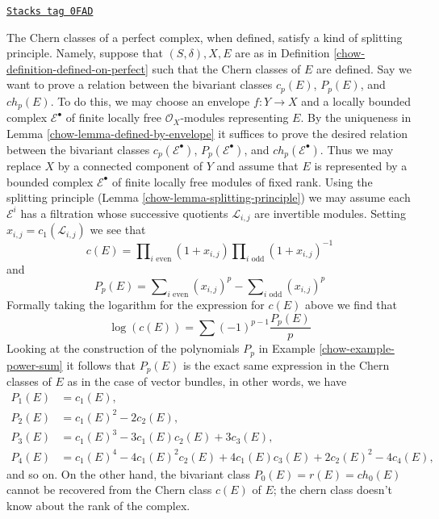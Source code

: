 \begin{remark}
\label{chow-remark-splitting-principle-perfect}
\href{https://stacks.math.columbia.edu/tag/0FAD}{\texttt{Stacks tag 0FAD}}

The Chern classes of a perfect complex, when defined, satisfy a kind of
splitting principle. Namely, suppose that $(S, \delta), X, E$ are as in
Definition \ref{chow-definition-defined-on-perfect}
such that the Chern classes of $E$ are defined.
Say we want to prove a relation between the bivariant classes
$c_p(E)$, $P_p(E)$, and $ch_p(E)$. To do this, we may choose an
envelope $f : Y \to X$ and a locally bounded
complex $\mathcal{E}^\bullet$ of finite locally free $\mathcal{O}_X$-modules
representing $E$. By the uniqueness in Lemma \ref{chow-lemma-defined-by-envelope}
it suffices to prove the desired relation between the bivariant classes
$c_p(\mathcal{E}^\bullet)$, $P_p(\mathcal{E}^\bullet)$, and
$ch_p(\mathcal{E}^\bullet)$. Thus we may replace $X$ by a connected
component of $Y$ and assume that $E$ is represented by a bounded
complex $\mathcal{E}^\bullet$ of finite locally free modules of fixed rank.
Using the splitting principle
(Lemma \ref{chow-lemma-splitting-principle}) we may assume each
$\mathcal{E}^i$ has a filtration whose successive
quotients $\mathcal{L}_{i, j}$ are invertible modules.
Setting $x_{i, j} = c_1(\mathcal{L}_{i, j})$ we see that
$$
c(E) =
\prod\nolimits_{i\text{ even}} (1 + x_{i, j})
\prod\nolimits_{i\text{ odd}} (1 + x_{i, j})^{-1}
$$
and
$$
P_p(E) =  \sum\nolimits_{i\text{ even}} (x_{i, j})^p -
\sum\nolimits_{i\text{ odd}} (x_{i, j})^p
$$
Formally taking the logarithm for the expression for $c(E)$ above
we find that
$$
\log(c(E)) = \sum (-1)^{p - 1}\frac{P_p(E)}{p}
$$
Looking at the construction of the polynomials $P_p$ in
Example \ref{chow-example-power-sum} it follows that $P_p(E)$
is the exact same expression in the Chern classes of $E$
as in the case of vector bundles, in other words, we have
\begin{align*}
P_1(E) & = c_1(E), \\
P_2(E) & = c_1(E)^2 - 2c_2(E), \\
P_3(E) & = c_1(E)^3 - 3c_1(E)c_2(E) + 3c_3(E), \\
P_4(E) & = c_1(E)^4 - 4c_1(E)^2c_2(E) + 4c_1(E)c_3(E) + 2c_2(E)^2 - 4c_4(E),
\end{align*}
and so on. On the other hand, the bivariant class $P_0(E) = r(E) = ch_0(E)$
cannot be recovered from the Chern class $c(E)$ of $E$; the chern class
doesn't know about the rank of the complex.
\end{remark}

